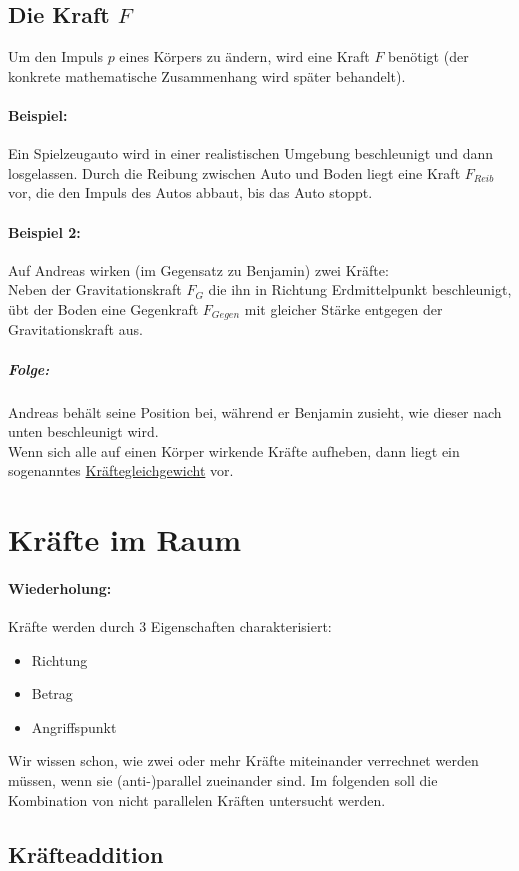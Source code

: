 	\subsection{Die Kraft $F$}
	Um den Impuls $ p $ eines Körpers zu ändern, wird eine Kraft $ F $ benötigt (der konkrete mathematische Zusammenhang wird später behandelt).
	\paragraph{Beispiel:}
	Ein Spielzeugauto wird in einer realistischen Umgebung beschleunigt und dann losgelassen.
	Durch die Reibung zwischen Auto und Boden liegt eine Kraft $ F_{Reib} $ vor, die den Impuls des Autos abbaut, bis das Auto stoppt.
	\paragraph{Beispiel 2:}
	Auf Andreas wirken (im Gegensatz zu Benjamin) zwei Kräfte:\\
	Neben der Gravitationskraft $ F_G $ die ihn in Richtung Erdmittelpunkt beschleunigt, übt der Boden eine Gegenkraft $ F_{Gegen} $ mit gleicher Stärke entgegen der Gravitationskraft aus.
	\subparagraph{Folge:}
	Andreas behält seine Position bei, während er Benjamin zusieht, wie dieser nach unten beschleunigt wird.\\
	Wenn sich alle auf einen Körper wirkende Kräfte aufheben, dann liegt ein sogenanntes \underline{Kräftegleichgewicht} vor.
	
	\section{Kräfte im Raum}
	\paragraph{Wiederholung:}
	Kräfte werden durch 3 Eigenschaften charakterisiert:
	\begin{itemize}
		\item Richtung
		\item Betrag
		\item Angriffspunkt
	\end{itemize}
	Wir wissen schon, wie zwei oder mehr Kräfte miteinander verrechnet werden müssen, wenn sie (anti-)parallel zueinander sind. Im folgenden soll die Kombination von nicht parallelen Kräften untersucht werden.
	
	\subsection{Kräfteaddition}
